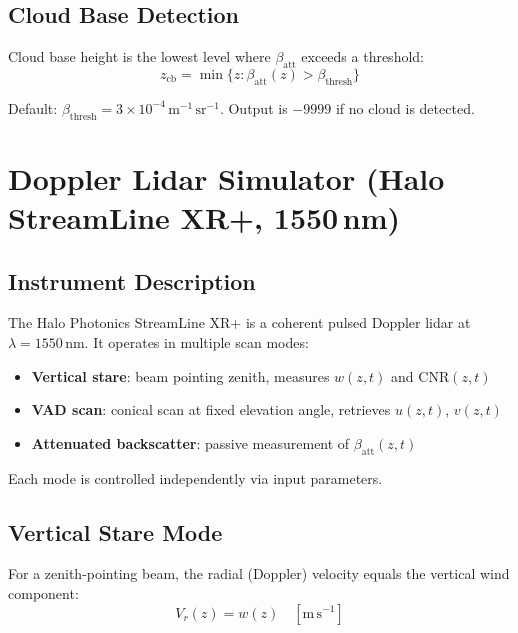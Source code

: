 \documentclass[11pt,letterpaper]{article}
\begin{document}
\subsection{Cloud Base Detection}

Cloud base height is the lowest level where $\beta_\mathrm{att}$ exceeds a threshold:
\begin{equation}
  z_\mathrm{cb} = \min\{z : \beta_\mathrm{att}(z) > \beta_\mathrm{thresh}\}
\end{equation}

Default: $\beta_\mathrm{thresh} = 3\times10^{-4}\,\mathrm{m}^{-1}\,\mathrm{sr}^{-1}$.
Output is $-9999$ if no cloud is detected.

\section{Doppler Lidar Simulator (Halo StreamLine XR+, 1550\,nm)}

\subsection{Instrument Description}

The Halo Photonics StreamLine XR+ is a coherent pulsed Doppler lidar at $\lambda=1550$\,nm.
It operates in multiple scan modes:
\begin{itemize}
  \item \textbf{Vertical stare}: beam pointing zenith, measures $w(z,t)$ and CNR$(z,t)$
  \item \textbf{VAD scan}: conical scan at fixed elevation angle, retrieves $u(z,t)$, $v(z,t)$
  \item \textbf{Attenuated backscatter}: passive measurement of $\beta_\mathrm{att}(z,t)$
\end{itemize}
Each mode is controlled independently via input parameters.

\subsection{Vertical Stare Mode}

For a zenith-pointing beam, the radial (Doppler) velocity equals the vertical wind component:
\begin{equation}
  V_r(z) = w(z) \quad [\mathrm{m\,s}^{-1}]
\end{equation}
\end{document}
